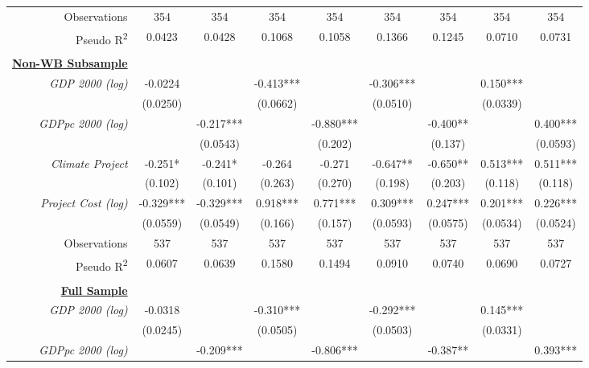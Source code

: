 \documentclass{article}
\begin{document}
\begin{singlespace}
\begin{table}[H]
{\begin{tabular}{rcccccccc}
			Observations & 354 & 354 & 354 & 354 & 354 & 354 & 354 & 354 \\
			Pseudo R\textsuperscript{2} & 0.0423 & 0.0428 & 0.1068 & 0.1058 & 0.1366 & 0.1245 & 0.0710 & 0.0731 \\ \hline
			\multicolumn{1}{l}{\textit{}} & \multicolumn{1}{l}{} & \multicolumn{1}{l}{} & \multicolumn{1}{l}{} & \multicolumn{1}{l}{} & \multicolumn{1}{l}{} & \multicolumn{1}{l}{} & \multicolumn{1}{l}{} & \multicolumn{1}{l}{} \\
			{\ul \textbf{Non-WB Subsample}} &  &  &  &  &  &  &  &  \\
			\textit{GDP 2000 (log)} & -0.0224 &  & -0.413*** &  & -0.306*** &  & 0.150*** &  \\
			\textit{} & (0.0250) &  & (0.0662) &  & (0.0510) &  & (0.0339) &  \\
			\textit{GDPpc 2000 (log)} &  & -0.217*** &  & -0.880*** &  & -0.400** &  & 0.400*** \\
			\textit{} &  & (0.0543) &  & (0.202) &  & (0.137) &  & (0.0593) \\
			\textit{Climate Project} & -0.251* & -0.241* & -0.264 & -0.271 & -0.647** & -0.650** & 0.513*** & 0.511*** \\
			\textit{} & (0.102) & (0.101) & (0.263) & (0.270) & (0.198) & (0.203) & (0.118) & (0.118) \\
			\textit{Project Cost (log)} & -0.329*** & -0.329*** & 0.918*** & 0.771*** & 0.309*** & 0.247*** & 0.201*** & 0.226*** \\
			\textit{} & (0.0559) & (0.0549) & (0.166) & (0.157) & (0.0593) & (0.0575) & (0.0534) & (0.0524) \\ \hline
			Observations & 537 & 537 & 537 & 537 & 537 & 537 & 537 & 537 \\
			Pseudo R\textsuperscript{2} & 0.0607 & 0.0639 & 0.1580 & 0.1494 & 0.0910 & 0.0740 & 0.0690 & 0.0727 \\ \hline
			\multicolumn{1}{l}{\textit{}} & \multicolumn{1}{l}{} & \multicolumn{1}{l}{} & \multicolumn{1}{l}{} & \multicolumn{1}{l}{} & \multicolumn{1}{l}{} & \multicolumn{1}{l}{} & \multicolumn{1}{l}{} & \multicolumn{1}{l}{} \\
			{\ul \textbf{Full Sample}} &  &  &  &  &  &  &  &  \\
			\textit{GDP 2000 (log)} & -0.0318 &  & -0.310*** &  & -0.292*** &  & 0.145*** &  \\
			\textit{} & (0.0245) &  & (0.0505) &  & (0.0503) &  & (0.0331) &  \\
			\textit{GDPpc 2000 (log)} &  & -0.209*** &  & -0.806*** &  & -0.387** &  & 0.393*** \\

\end{tabular}}
\end{table}
\end{singlespace}
\end{document}
